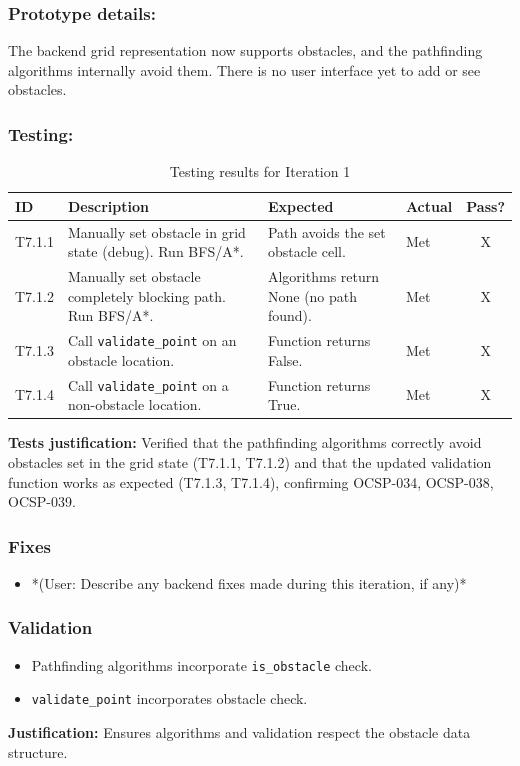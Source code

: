 \newpage
\subsubsection{Prototype details:}
The backend grid representation now supports obstacles, and the pathfinding algorithms internally avoid them. There is no user interface yet to add or see obstacles.

\subsubsection{Testing:} %
\begin{table}[htbp]
	\centering
	\begin{tabularx}{\textwidth}{|l|X|p{4.5cm}|p{1.5cm}|c|}
		\hline
		\textbf{ID} & \textbf{Description} & \textbf{Expected} & \textbf{Actual} & \textbf{Pass?} \\
		\hline
		T7.1.1 & Manually set obstacle in grid state (debug). Run BFS/A*. & Path avoids the set obstacle cell. & Met & X \\
		\hline
		T7.1.2 & Manually set obstacle completely blocking path. Run BFS/A*. & Algorithms return None (no path found). & Met & X \\
		\hline
		T7.1.3 & Call \verb|validate_point| on an obstacle location. & Function returns False. & Met & X \\
		\hline
		T7.1.4 & Call \verb|validate_point| on a non-obstacle location. & Function returns True. & Met & X \\
		\hline
	\end{tabularx}
	\caption{Testing results for Iteration 1}
\end{table}
\textbf{Tests justification:} Verified that the pathfinding algorithms correctly avoid obstacles set in the grid state (T7.1.1, T7.1.2) and that the updated validation function works as expected (T7.1.3, T7.1.4), confirming OCSP-034, OCSP-038, OCSP-039.

\subsubsection{Fixes}
\begin{itemize}
	\item *(User: Describe any backend fixes made during this iteration, if any)*
\end{itemize}

\subsubsection{Validation}
\begin{itemize}
	\item Pathfinding algorithms incorporate \verb|is_obstacle| check.
	\item \verb|validate_point| incorporates obstacle check.
\end{itemize}
\textbf{Justification:} Ensures algorithms and validation respect the obstacle data structure.

